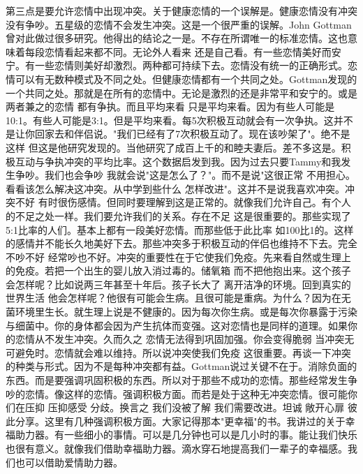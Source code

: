 第三点是要允许恋情中出现冲突。关于健康恋情的一个误解是。健康恋情没有冲突 没有争吵。五星级的恋情不会发生冲突。这是一个很严重的误解。John Gottman曾对此做过很多研究。他得出的结论之一是。不存在所谓唯一的标准恋情。这也意味着每段恋情看起来都不同。无论外人看来 还是自己看。有一些恋情美好而安宁。有一些恋情则美好却激烈。两种都可持续下去。恋情没有统一的正确形式。恋情可以有无数种模式及不同之处。但健康恋情都有一个共同之处。Gottman发现的一个共同之处。那就是在所有的恋情中。无论是激烈的还是非常平和安宁的。或是两者兼之的恋情 都有争执。而且平均来看 只是平均来看。因为有些人可能是10:1。有些人可能是3:1。但是平均来看。每5次积极互动就会有一次争执。这并不是让你回家去和伴侣说。"我们已经有了7次积极互动了。现在该吵架了"。绝不是这样 但这是他研究发现的。当他研究了成百上千的和睦夫妻后。差不多这是。积极互动与争执冲突的平均比率。这个数据启发到我。因为过去只要Tammy和我发生争吵。我们也会争吵 我就会说"这是怎么了？"。而不是说"这很正常 不用担心。看看该怎么解决这冲突。从中学到些什么 怎样改进"。这并不是说我喜欢冲突。冲突不好 有时很伤感情。但同时要理解到这是正常的。就像我们允许自己。有个人的不足之处一样。我们要允许我们的关系。存在不足 这是很重要的。那些实现了5:1比率的人们。基本上都有一段美好恋情。而那些低于此比率 如100比1的。这样的感情并不能长久地美好下去。那些冲突多于积极互动的伴侣也维持不下去。完全不吵不好 经常吵也不好。冲突的重要性在于它使我们免疫。先来看自然或生理上的免疫。若把一个出生的婴儿放入消过毒的。储氧箱 而不把他抱出来。这个孩子会怎样呢？比如说两三年甚至十年后。孩子长大了 离开洁净的环境。回到真实的世界生活 他会怎样呢？他很有可能会生病。且很可能是重病。为什么？因为在无菌环境里生长。就生理上说是不健康的。因为每次你生病。或是每次你暴露于污染与细菌中。你的身体都会因为产生抗体而变强。这对恋情也是同样的道理。如果你的恋情从不发生冲突。久而久之 恋情无法得到巩固加强。你会变得脆弱 当冲突无可避免时。恋情就会难以维持。所以说冲突使我们免疫 这很重要。再谈一下冲突的种类与形式。因为不是每种冲突都有益。Gottman说过关键不在于。消除负面的东西。而是要强调巩固积极的东西。所以对于那些不成功的恋情。那些经常发生争吵的恋情。像这样的恋情。强调积极方面。而若是处于这种无冲突恋情。很可能你们在压抑 压抑感受 分歧。换言之 我们没被了解 我们需要改进。坦诚 敞开心扉 彼此分享。这里有几种强调积极方面。大家记得那本"更幸福"的书。我讲过的关于幸福助力器。有一些细小的事情。可以是几分钟也可以是几小时的事。能让我们快乐 也很有意义。就像我们借助幸福助力器。滴水穿石地提高我们一辈子的幸福感。我们也可以借助爱情助力器。 

